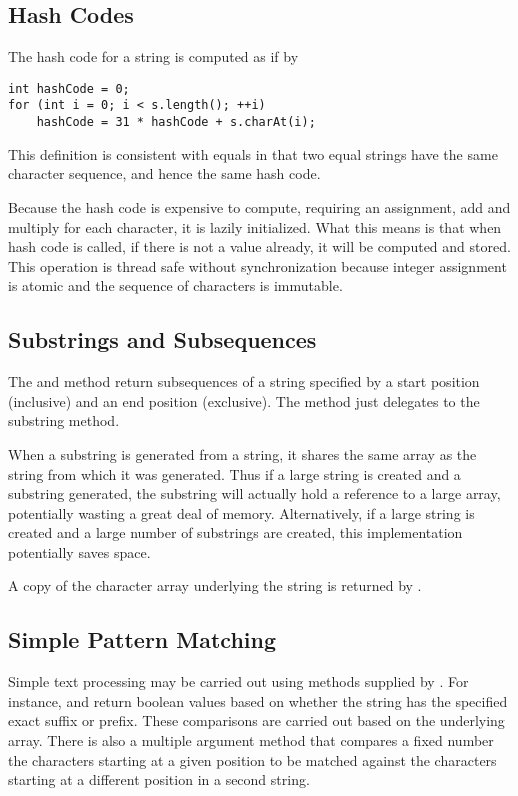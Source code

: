 \subsection{Hash Codes}

The hash code for a string  is computed as if by
%
\begin{verbatim}
int hashCode = 0;
for (int i = 0; i < s.length(); ++i)
    hashCode = 31 * hashCode + s.charAt(i);
\end{verbatim}
%
This definition is consistent with equals in that two equal strings
have the same character sequence, and hence the same hash code.

Because the hash code is expensive to compute, requiring an
assignment, add and multiply for each character, it is lazily
initialized.  What this means is that when hash code is called, if
there is not a value already, it will be computed and stored. This
operation is thread safe without synchronization because integer
assignment is atomic and the sequence of characters is immutable.

\subsection{Substrings and Subsequences}

The  and method return subsequences of a
string specified by a start position (inclusive) and an end position
(exclusive).  The  method just delegates to
the substring method.

When a substring is generated from a string, it shares the same array
as the string from which it was generated.  Thus if a large string is
created and a substring generated, the substring will actually hold a
reference to a large array, potentially wasting a great deal of
memory.  Alternatively, if a large string is created and a large
number of substrings are created, this implementation potentially
saves space.

A copy of the character array underlying the string is returned
by .  

\subsection{Simple Pattern Matching}

Simple text processing may be carried out using methods supplied
by .  For instance,  and
 return boolean values based on whether
the string has the specified exact suffix or prefix.  These
comparisons are carried out based on the underlying 
array.  There is also a multiple argument 
method that compares a fixed number the characters starting at a given
position to be matched against the characters starting at a different
position in a second string.

